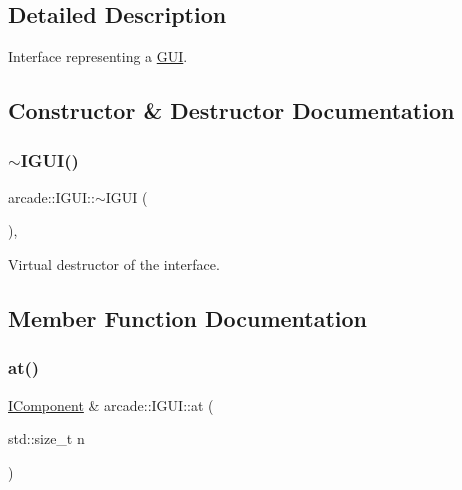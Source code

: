 \subsection{Detailed Description}
Interface representing a \hyperlink{classarcade_1_1_g_u_i}{G\+UI}. 

\subsection{Constructor \& Destructor Documentation}
\mbox{\label{classarcade_1_1_i_g_u_i_ae93e1b1b586b51ebfc760d35c0af3ba3}} 
\subsubsection{\texorpdfstring{$\sim$\+I\+G\+U\+I()}{~IGUI()}}
{\footnotesize\ttfamily arcade\+::\+I\+G\+U\+I\+::$\sim$\+I\+G\+UI (\begin{DoxyParamCaption}{ }\end{DoxyParamCaption})\hspace{0.3cm}{\ttfamily [inline]}, {\ttfamily [virtual]}}



Virtual destructor of the interface. 



\subsection{Member Function Documentation}
\mbox{\label{classarcade_1_1_i_g_u_i_aafde8788a75c98d0dfc1161e42e13558}} 
\subsubsection{\texorpdfstring{at()}{at()}}
{\footnotesize\ttfamily \hyperlink{classarcade_1_1_i_component}{I\+Component} \& arcade\+::\+I\+G\+U\+I\+::at (\begin{DoxyParamCaption}\item[{std\+::size\+\_\+t}]{n }\end{DoxyParamCaption})\hspace{0.3cm}{\ttfamily [pure virtual]}}



